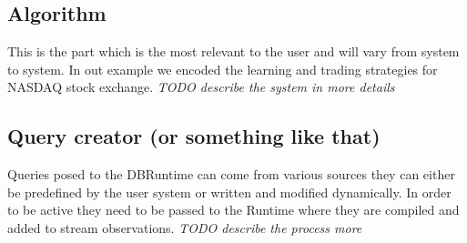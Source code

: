 \documentclass[11pt]{article}
\begin{document}
\subsection{Algorithm}

This is the part which is the most relevant to the user and will vary from system to system. In out example we encoded the learning and trading strategies for NASDAQ stock exchange. \emph{TODO describe the system in more details}

\subsection{Query creator (or something like that)}

Queries posed to the DBRuntime can come from various sources they can either be predefined by the user system or written and modified dynamically. In order to be active they need to be passed to the Runtime where they are compiled and added to stream observations. \emph{TODO describe the process more}
\end{document}

